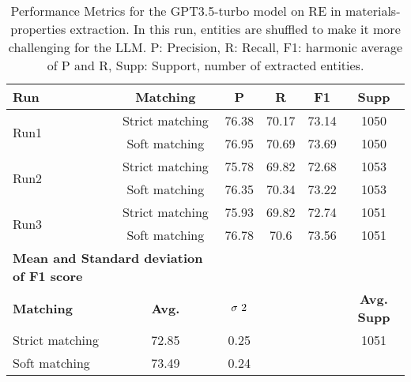 \begin{table}[htbp]
    \small
    \centering
    \caption{Performance Metrics for the GPT3.5-turbo model on RE in materials-properties extraction. In this run, entities are shuffled to make it more challenging for the LLM. P: Precision, R: Recall, F1: harmonic average of P and R, Supp: Support, number of extracted entities.}
    \begin{tabular}{lccccc}
        \toprule
        \textbf{Run} & \textbf{Matching} & \textbf{P} & \textbf{R} & \textbf{F1} & \textbf{Supp} \\
        \midrule
        \multirow{2}{*}{Run1} & Strict matching & 76.38 & 70.17 & 73.14 & 1050 \\
        & Soft matching & 76.95 & 70.69 & 73.69 & 1050 \\
        \midrule
        \multirow{2}{*}{Run2} & Strict matching & 75.78 & 69.82 & 72.68 & 1053 \\
        & Soft matching & 76.35 & 70.34 & 73.22 & 1053 \\
        \midrule
        \multirow{2}{*}{Run3} & Strict matching & 75.93 & 69.82 & 72.74 & 1051 \\
        & Soft matching & 76.78 & 70.6 & 73.56 & 1051 \\
        \midrule
        \multicolumn{2}{l}{\textbf{Mean and Standard deviation of F1 score}} & & & & \\
        \midrule
        \textbf{Matching} & \textbf{Avg.} & $\sigma\textsuperscript{2}$ & & & \textbf{Avg. Supp}\\
        Strict matching & 72.85 & 0.25 & & & 1051 \\
        Soft matching & 73.49 & 0.24 & & & \\
        \bottomrule
    \end{tabular}
\end{table}


